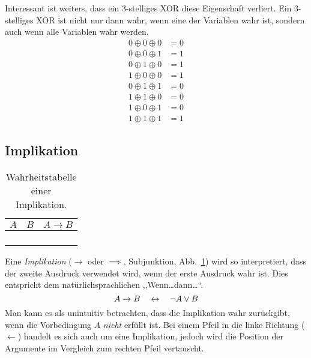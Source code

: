 Interessant ist weiters, dass ein 3-stelliges XOR diese Eigenschaft verliert. Ein 3-stelliges XOR ist nicht nur dann wahr, wenn eine der Variablen wahr ist, sondern auch wenn alle Variablen wahr werden.
%
\begin{align*}
  0 \oplus{} 0 \oplus{} 0 & = 0 \\
  0 \oplus{} 0 \oplus{} 1 & = 1 \\
  0 \oplus{} 1 \oplus{} 0 & = 1 \\
  1 \oplus{} 0 \oplus{} 0 & = 1 \\
  0 \oplus{} 1 \oplus{} 1 & = 0 \\
  1 \oplus{} 1 \oplus{} 0 & = 0 \\
  1 \oplus{} 0 \oplus{} 1 & = 0 \\
  1 \oplus{} 1 \oplus{} 1 & = 1
\end{align*}
%
\subsection{Implikation}
%
\begin{table}[ht]
 \begin{center}
  \begin{tabular}{cc|c}
   \hline
    $A$ & $B$ & $A \rightarrow{} B$ \\
   \hline \hline
    \F  & \F  & \T \\
    \F  & \T  & \T \\
    \T  & \F  & \F \\
    \T  & \T  & \T \\
  \end{tabular}
  \caption{Wahrheitstabelle einer Implikation.}
  \label{fig:implication_operator}
 \end{center}
\end{table}
%
Eine \emph{Implikation} ($\rightarrow$ oder $\implies$, Subjunktion, Abb.~\ref{fig:implication_operator}) wird so interpretiert, dass der zweite Ausdruck verwendet wird, wenn der erste Ausdruck wahr ist. Dies entspricht dem natürlichsprachlichen ,,Wenn\dots dann\dots``.
\begin{equation}
  A \rightarrow B \quad\leftrightarrow\quad \neg A \lor B
\end{equation}
%
Man kann es als unintuitiv betrachten, dass die Implikation wahr zurückgibt, wenn die Vorbedingung $A$ \emph{nicht} erfüllt ist. Bei einem Pfeil in die linke Richtung ($\leftarrow$) handelt es sich auch um eine Implikation, jedoch wird die Position der Argumente im Vergleich zum rechten Pfeil vertauscht.

